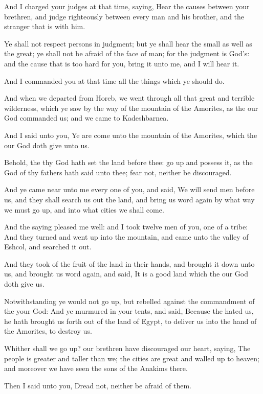 \verse And I charged your judges at that time, saying, Hear the causes between your brethren, and judge righteously between every man and his brother, and the stranger that is with him.

\verse Ye shall not respect persons in judgment; but ye shall hear the small as well as the great; ye shall not be afraid of the face of man; for the judgment is God's: and the cause that is too hard for you, bring it unto me, and I will hear it.

\verse And I commanded you at that time all the things which ye should do.

\verse And when we departed from Horeb, we went through all that great and terrible wilderness, which ye saw by the way of the mountain of the Amorites, as the \LORD our God commanded us; and we came to Kadeshbarnea.

\verse And I said unto you, Ye are come unto the mountain of the Amorites, which the \LORD our God doth give unto us.

\verse Behold, the \LORD thy God hath set the land before thee: go up and possess it, as the \LORD God of thy fathers hath said unto thee; fear not, neither be discouraged.

\verse And ye came near unto me every one of you, and said, We will send men before us, and they shall search us out the land, and bring us word again by what way we must go up, and into what cities we shall come.

\verse And the saying pleased me well: and I took twelve men of you, one of a tribe: \verse And they turned and went up into the mountain, and came unto the valley of Eshcol, and searched it out.

\verse And they took of the fruit of the land in their hands, and brought it down unto us, and brought us word again, and said, It is a good land which the \LORD our God doth give us.

\verse Notwithstanding ye would not go up, but rebelled against the commandment of the \LORD your God: \verse And ye murmured in your tents, and said, Because the \LORD hated us, he hath brought us forth out of the land of Egypt, to deliver us into the hand of the Amorites, to destroy us.

\verse Whither shall we go up? our brethren have discouraged our heart, saying, The people is greater and taller than we; the cities are great and walled up to heaven; and moreover we have seen the sons of the Anakims there.

\verse Then I said unto you, Dread not, neither be afraid of them.

